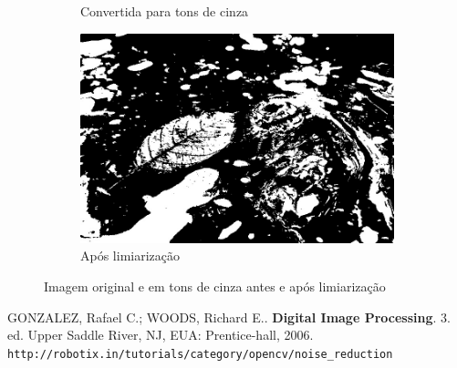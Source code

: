 \documentclass[10pt,a4paper]{article}
\begin{document}
\begin{figure}[!ht]
\begin{subfigure}[ht]{0.45\textwidth}
        \caption{Convertida para tons de cinza}
        \label{fig:src_thr}
    \end{subfigure}
    \qquad
    \begin{subfigure}[ht]{0.45\textwidth}
        \includegraphics[width=\textwidth]{dst_thr.jpg}
        \caption{Após limiarização}
        \label{fig:dst_thr}
    \end{subfigure}
    \caption{Imagem original e em tons de cinza antes e após limiarização}
\end{figure}

\begin{thebibliography}{99}
     GONZALEZ, Rafael C.; WOODS, Richard E.. \textbf{Digital Image Processing}. 3. ed. Upper Saddle River, NJ, EUA: Prentice-hall, 2006.
     \texttt{http://robotix.in/tutorials/category/opencv/noise\_reduction}
\end{thebibliography}
\end{document}
